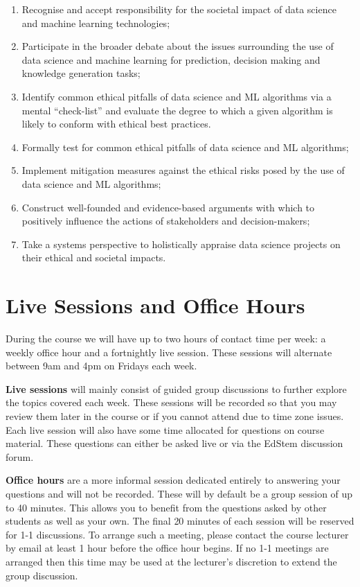 \documentclass[
]{book}
\theoremstyle{definition}
\theoremstyle{definition}
\theoremstyle{definition}
\theoremstyle{definition}
\theoremstyle{remark}
\begin{document}
\begin{enumerate}
\def\labelenumi{\arabic{enumi}.}
\item
  Recognise and accept responsibility for the societal impact of data
  science and machine learning technologies;
\item
  Participate in the broader debate about the issues surrounding the
  use of data science and machine learning for prediction, decision
  making and knowledge generation tasks;
\item
  Identify common ethical pitfalls of data science and ML algorithms
  via a mental ``check-list'' and evaluate the degree to which a given
  algorithm is likely to conform with ethical best practices.
\item
  Formally test for common ethical pitfalls of data science and ML
  algorithms;
\item
  Implement mitigation measures against the ethical risks posed by the
  use of data science and ML algorithms;
\item
  Construct well-founded and evidence-based arguments with which to
  positively influence the actions of stakeholders and
  decision-makers;
\item
  Take a systems perspective to holistically appraise data science
  projects on their ethical and societal impacts.
\end{enumerate}

\hypertarget{live-sessions-and-office-hours}{%
\section{Live Sessions and Office Hours}\label{live-sessions-and-office-hours}}

During the course we will have up to two hours of contact time per week:
a weekly office hour and a fortnightly live session. These sessions will
alternate between 9am and 4pm on Fridays each week.

\textbf{Live sessions} will mainly consist of guided group discussions to
further explore the topics covered each week. These sessions will be
recorded so that you may review them later in the course or if you
cannot attend due to time zone issues. Each live session will also have
some time allocated for questions on course material. These questions
can either be asked live or via the EdStem discussion forum.

\textbf{Office hours} are a more informal session dedicated entirely to
answering your questions and will not be recorded. These will by default
be a group session of up to 40 minutes. This allows you to benefit from
the questions asked by other students as well as your own. The final 20
minutes of each session will be reserved for 1-1 discussions. To arrange
such a meeting, please contact the course lecturer by email at least 1
hour before the office hour begins. If no 1-1 meetings are arranged then
this time may be used at the lecturer's discretion to extend the group
discussion.
\end{document}
